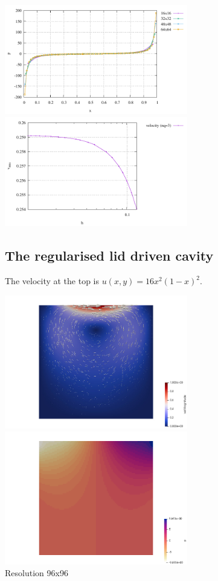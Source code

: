 \begin{center}
\includegraphics[width=8cm]{python_codes/fieldstone_80/results/ldc/p_top}
\includegraphics[width=8cm]{python_codes/fieldstone_80/results/ldc/vrms}
\end{center}

\subsection*{The regularised lid driven cavity}

The velocity at the top is $u(x,y)=16x^2(1-x)^2$. 

\begin{center}
\includegraphics[width=8cm]{python_codes/fieldstone_80/results/ldc_reg/vel}
\includegraphics[width=8cm]{python_codes/fieldstone_80/results/ldc_reg/p}\\
{\captionfont Resolution 96x96}
\end{center}

